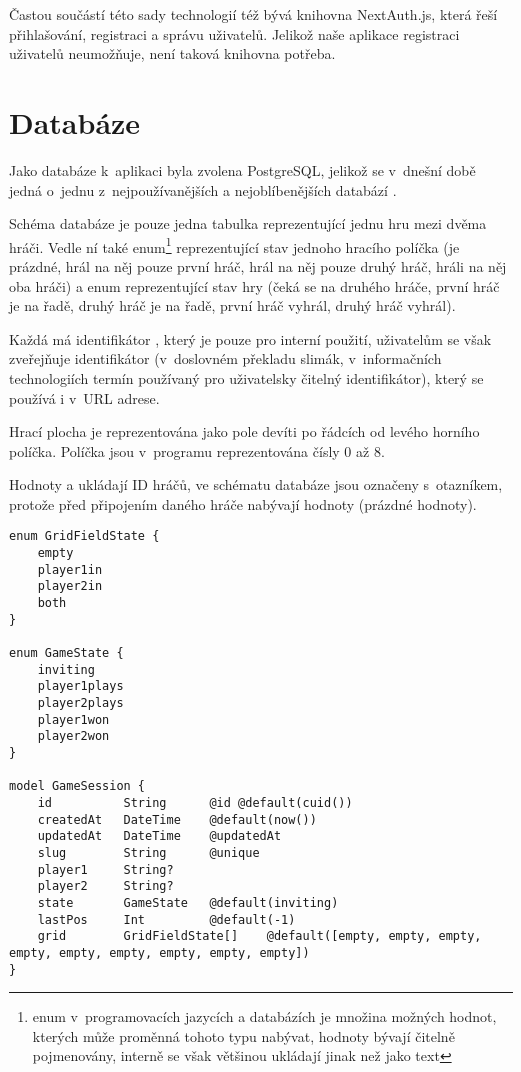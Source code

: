 Častou součástí této sady technologií též bývá knihovna NextAuth.js, která řeší
přihlašování, registraci a správu uživatelů. Jelikož naše aplikace registraci
uživatelů neumožňuje, není taková knihovna potřeba.

\section{Databáze}

Jako databáze k~aplikaci byla zvolena PostgreSQL, jelikož se v~dnešní době
jedná o~jednu z~nejpoužívanějších a nejoblíbenějších databází \cite{stackoverflow23}.

Schéma databáze je pouze jedna tabulka  reprezentující jednu hru
mezi dvěma hráči. Vedle ní také enum\footnote{enum v~programovacích jazycích a
databázích je množina možných hodnot, kterých může proměnná tohoto typu
nabývat, hodnoty bývají čitelně pojmenovány, interně se však většinou ukládají
jinak než jako text}  reprezentující stav jednoho hracího
políčka (je prázdné, hrál na něj pouze první hráč, hrál na něj pouze druhý
hráč, hráli na něj oba hráči) a enum  reprezentující stav hry
(čeká se na druhého hráče, první hráč je na řadě, druhý hráč je na řadě, první
hráč vyhrál, druhý hráč vyhrál).

Každá  má identifikátor , který je pouze pro interní
použití, uživatelům se však zveřejňuje identifikátor  (v~doslovném
překladu slimák, v~informačních technologiích termín používaný pro uživatelsky
čitelný identifikátor), který se používá i v~URL adrese.\label{par:game-id}

\label{par:game-grid}
Hrací plocha je reprezentována jako pole devíti  po řádcích
od levého horního políčka. Políčka jsou v~programu reprezentována čísly 0 až 8.

Hodnoty  a  ukládají ID hráčů, ve schématu databáze jsou
označeny s~otazníkem, protože před připojením daného hráče nabývají hodnoty
 (prázdné hodnoty).

\begin{lstlisting}[language=Prisma,caption={Schéma databáze},label={fig:db-schema}]
enum GridFieldState {
    empty
    player1in
    player2in
    both
}

enum GameState {
    inviting
    player1plays
    player2plays
    player1won
    player2won
}

model GameSession {
    id          String      @id @default(cuid())
    createdAt   DateTime    @default(now())
    updatedAt   DateTime    @updatedAt
    slug        String      @unique
    player1     String?
    player2     String?
    state       GameState   @default(inviting)
    lastPos     Int         @default(-1)
    grid        GridFieldState[]    @default([empty, empty, empty, empty, empty, empty, empty, empty, empty])
}
\end{lstlisting}

